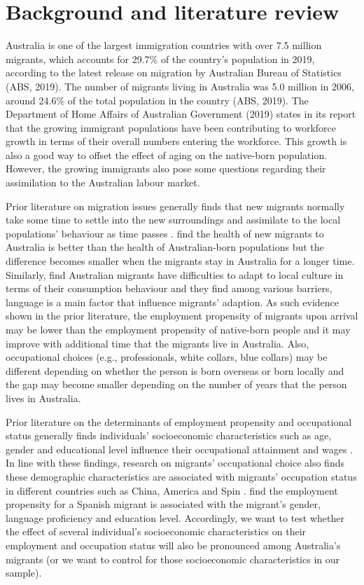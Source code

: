 \section{Background and literature review}
\label{sec:Background and literature review}

Australia is one of the largest immigration countries with over 7.5 million migrants, which accounts for 29.7\% of the country’s population in 2019, according to the latest release on migration by Australian Bureau of Statistics (ABS, 2019).
The number of migrants living in Australia was 5.0 million in 2006, around 24.6\% of the total population in the country (ABS, 2019).
The Department of Home Affairs of Australian Government (2019) states in its report that the growing immigrant populations have been contributing to workforce growth in terms of their overall numbers entering the workforce.
This growth is also a good way to offset the effect of aging on the native-born population.
However, the growing immigrants also pose some questions regarding their assimilation to the Australian labour market.

Prior literature on migration issues generally finds that new migrants normally take some time to settle into the new surroundings and assimilate to the local populations’ behaviour as time passes \citep{BIDDLE2007,Arli2018}.
\citet{BIDDLE2007} find the health of new migrants to Australia is better than the health of Australian-born populations but the difference becomes smaller when the migrants stay in Australia for a longer time.
Similarly, \citet{Arli2018} find Australian migrants have difficulties to adapt to local culture in terms of their consumption behaviour and they find among various barriers, language is a main factor that influence migrants’ adaption.
As such evidence shown in the prior literature, the employment propensity of migrants upon arrival may be lower than the employment propensity of native-born people and it may improve with additional time that the migrants live in Australia.
Also, occupational choices (e.g., professionals, white collars, blue collars) may be different depending on whether the person is born overseas or born locally and the gap may become smaller depending on the number of years that the person lives in Australia.

Prior literature on the determinants of employment propensity and occupational status generally finds individuals’ socioeconomic characteristics such as age, gender and educational level influence their occupational attainment and wages \citep{Schmidt1975,Chapman1986}.
In line with these findings, research on migrants’ occupational choice also finds these demographic characteristics are associated with migrants’ occupation status in different countries such as China, America and Spin \citep{Xing2016,Laird2015,AmuedoDorantes2007}.
\citet{AmuedoDorantes2007} find the employment propensity for a Spanish migrant is associated with the migrant’s gender, language proficiency and education level.
Accordingly, we want to test whether the effect of several individual’s socioeconomic characteristics on their employment and occupation status will also be pronounced among Australia’s migrants (or we want to control for those socioeconomic characteristics in our sample).

